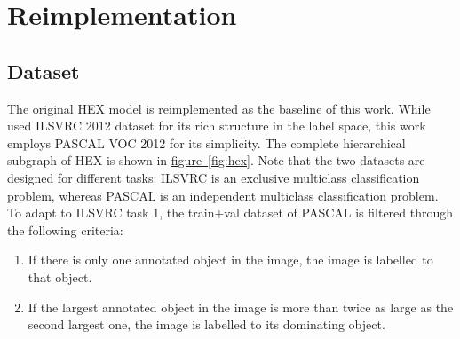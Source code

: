 \documentclass[11pt,a4paper]{article}
\begin{document}
\clearpage
\section{Reimplementation}
\subsection{Dataset}
\label{sec:data}

The original HEX model is reimplemented as the baseline of this work. While \cite{deng2014large} used ILSVRC 2012 dataset for its rich structure in the label space, this work employs PASCAL VOC 2012 \cite{pascal-voc-2012} for its simplicity. The complete hierarchical subgraph of HEX is shown in \hyperref[fig:hex]{figure~\ref{fig:hex}}. Note that the two datasets are designed for different tasks: ILSVRC is an exclusive multiclass classification problem, whereas PASCAL is an independent multiclass classification problem. To adapt to ILSVRC task 1, the train+val dataset of PASCAL is filtered through the following criteria:
\begin{enumerate}
\item If there is only one annotated object in the image, the image is labelled to that object.
\item If the largest annotated object in the image is more than twice as large as the second largest one, the image is labelled to its dominating object.
\end{enumerate}
\end{document}
